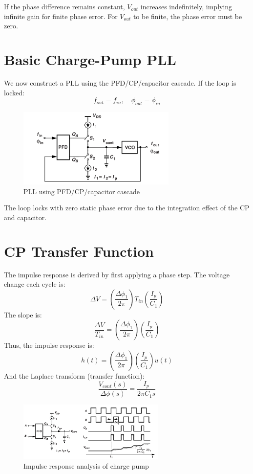 \documentclass[12pt]{article}
\begin{document}
If the phase difference remains constant, $V_{out}$ increases indefinitely, implying infinite gain for finite phase error. For $V_{out}$ to be finite, the phase error must be zero.

\section{Basic Charge-Pump PLL}
We now construct a PLL using the PFD/CP/capacitor cascade. If the loop is locked:
\[
f_{out} = f_{in}, \quad \phi_{out} = \phi_{in}
\]

\begin{figure}[H]
    \centering
    \includegraphics[width=0.7\textwidth]{figs/cp3}
    \caption{PLL using PFD/CP/capacitor cascade}
\end{figure}

The loop locks with zero static phase error due to the integration effect of the CP and capacitor.

\section{CP Transfer Function}
The impulse response is derived by first applying a phase step. The voltage change each cycle is:
\[
\Delta V = \left(\frac{\Delta \phi_1}{2\pi}\right)T_{in}\left(\frac{I_p}{C_1}\right)
\]
The slope is:
\[
\frac{\Delta V}{T_{in}} = \left(\frac{\Delta \phi_1}{2\pi}\right)\left(\frac{I_p}{C_1}\right)
\]
Thus, the impulse response is:
\[
h(t) = \left(\frac{\Delta \phi_1}{2\pi}\right)\left(\frac{I_p}{C_1}\right)u(t)
\]
And the Laplace transform (transfer function):
\[
\frac{V_{cont}(s)}{\Delta \phi(s)} = \frac{I_p}{2\pi C_1 s}
\]

\begin{figure}[H]
    \centering
    \includegraphics[width=0.65\textwidth]{figs/cp4}
    \caption{Impulse response analysis of charge pump}
\end{figure}
\end{document}
